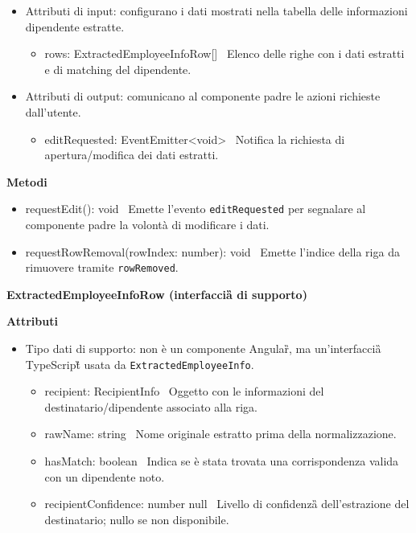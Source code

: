 \documentclass[a4paper,11pt]{article}
\begin{document}
\begin{itemize}[noitemsep, topsep=0pt]
  \item Attributi di input: configurano i dati mostrati nella tabella delle informazioni dipendente estratte.
    \begin{itemize}
      \item rows: ExtractedEmployeeInfoRow[] \
      Elenco delle righe con i dati estratti e di matching del dipendente.
    \end{itemize}

  \item Attributi di output: comunicano al componente padre le azioni richieste dall'utente.
    \begin{itemize}
      \item editRequested: EventEmitter<void>  \
      Notifica la richiesta di apertura/modifica dei dati estratti.
    \end{itemize}
  \end{itemize}

\textbf{Metodi}

\begin{itemize}
  \item requestEdit(): void \
  Emette l'evento \texttt{editRequested} per segnalare al componente padre la volontà di modificare i dati.

  \item requestRowRemoval(rowIndex: number): void \
  Emette l'indice della riga da rimuovere tramite \texttt{rowRemoved}.
\end{itemize}

\textbf{ExtractedEmployeeInfoRow (interfaccia\G{} di supporto)}

\textbf{Attributi}
\begin{itemize}[noitemsep, topsep=0pt]
  \item Tipo dati di supporto: non è un componente Angular\G{}, ma un'interfaccia\G{} TypeScript\G{} usata da \texttt{ExtractedEmployeeInfo}.
  \begin{itemize}
    \item recipient: RecipientInfo \
    Oggetto con le informazioni del destinatario/dipendente associato alla riga.

    \item rawName: string \
    Nome originale estratto prima della normalizzazione.

    \item hasMatch: boolean \
    Indica se è stata trovata una corrispondenza valida con un dipendente noto.

    \item recipientConfidence: number \textbar{} null \
    Livello di confidenza\G{} dell'estrazione del destinatario; nullo se non disponibile.
  \end{itemize}
\end{itemize}
\end{document}
